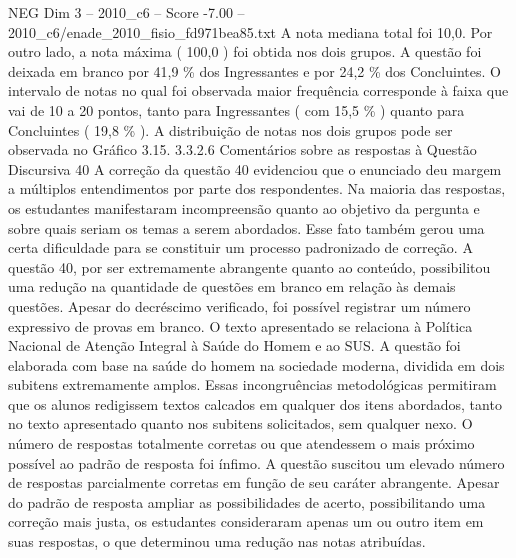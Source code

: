 \begin{textsample}{NEG Dim 3 – 2010\_c6 – Score -7.00 – 2010\_c6/enade\_2010\_fisio\_fd971bea85.txt}
A nota mediana total foi 10,0.
Por outro lado, a nota máxima ( 100,0 ) foi obtida nos dois grupos.
A questão foi deixada em branco por 41,9 \% dos Ingressantes e por 24,2 \% dos Concluintes.
O intervalo de notas no qual foi observada maior frequência corresponde à faixa que vai de 10 a 20 pontos, tanto para Ingressantes ( com 15,5 \% ) quanto para Concluintes ( 19,8 \% ).
A distribuição de notas nos dois grupos pode ser observada no Gráfico 3.15. 3.3.2.6 Comentários sobre as respostas à Questão Discursiva 40 A correção da questão 40 evidenciou que o enunciado deu margem a múltiplos entendimentos por parte dos respondentes.
Na maioria das respostas, os estudantes manifestaram incompreensão quanto ao objetivo da pergunta e sobre quais seriam os temas a serem abordados.
Esse fato também gerou uma certa dificuldade para se constituir um processo padronizado de correção.
A questão 40, por ser extremamente abrangente quanto ao conteúdo, possibilitou uma redução na quantidade de questões em branco em relação às demais questões.
Apesar do decréscimo verificado, foi possível registrar um número expressivo de provas em branco.
O texto apresentado se relaciona à Política Nacional de Atenção Integral à Saúde do Homem e ao SUS.
A questão foi elaborada com base na saúde do homem na sociedade moderna, dividida em dois subitens extremamente amplos.
Essas incongruências metodológicas permitiram que os alunos redigissem textos calcados em qualquer dos itens abordados, tanto no texto apresentado quanto nos subitens solicitados, sem qualquer nexo.
O número de respostas totalmente corretas ou que atendessem o mais próximo possível ao padrão de resposta foi ínfimo.
A questão suscitou um elevado número de respostas parcialmente corretas em função de seu caráter abrangente.
Apesar do padrão de resposta ampliar as possibilidades de acerto, possibilitando uma correção mais justa, os estudantes consideraram apenas um ou outro item em suas respostas, o que determinou uma redução nas notas atribuídas.

\end{textsample}

